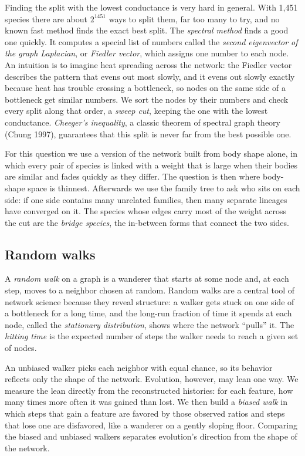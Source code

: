 \documentclass[11pt]{article}
\begin{document}
Finding the split with the lowest conductance is very hard in general. With 1,451 species there are about $2^{1451}$ ways to split them, far too many to try, and no known fast method finds the exact best split. The \emph{spectral method} finds a good one quickly. It computes a special list of numbers called the \emph{second eigenvector of the graph Laplacian}, or \emph{Fiedler vector}, which assigns one number to each node. An intuition is to imagine heat spreading across the network: the Fiedler vector describes the pattern that evens out most slowly, and it evens out slowly exactly because heat has trouble crossing a bottleneck, so nodes on the same side of a bottleneck get similar numbers. We sort the nodes by their numbers and check every split along that order, a \emph{sweep cut}, keeping the one with the lowest conductance. \emph{Cheeger's inequality}, a classic theorem of spectral graph theory (Chung 1997), guarantees that this split is never far from the best possible one.

For this question we use a version of the network built from body shape alone, in which every pair of species is linked with a weight that is large when their bodies are similar and fades quickly as they differ. The question is then where body-shape space is thinnest. Afterwards we use the family tree to ask who sits on each side: if one side contains many unrelated families, then many separate lineages have converged on it. The species whose edges carry most of the weight across the cut are the \emph{bridge species}, the in-between forms that connect the two sides.

\subsection{Random walks}

A \emph{random walk} on a graph is a wanderer that starts at some node and, at each step, moves to a neighbor chosen at random. Random walks are a central tool of network science because they reveal structure: a walker gets stuck on one side of a bottleneck for a long time, and the long-run fraction of time it spends at each node, called the \emph{stationary distribution}, shows where the network ``pulls'' it. The \emph{hitting time} is the expected number of steps the walker needs to reach a given set of nodes.

An unbiased walker picks each neighbor with equal chance, so its behavior reflects only the shape of the network. Evolution, however, may lean one way. We measure the lean directly from the reconstructed histories: for each feature, how many times more often it was gained than lost. We then build a \emph{biased walk} in which steps that gain a feature are favored by those observed ratios and steps that lose one are disfavored, like a wanderer on a gently sloping floor. Comparing the biased and unbiased walkers separates evolution's direction from the shape of the network.
\end{document}
